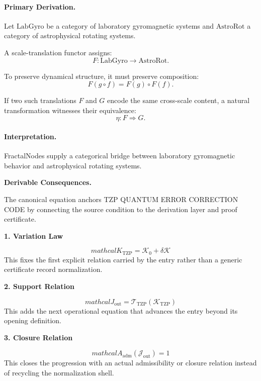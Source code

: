 \paragraph{Primary Derivation.}
Let $\mathrm{LabGyro}$ be a category of laboratory gyromagnetic systems and $\mathrm{AstroRot}$ a category of astrophysical rotating systems.

A scale-translation functor assigns:
\begin{equation}
F:\mathrm{LabGyro}\to\mathrm{AstroRot}.
\end{equation}

To preserve dynamical structure, it must preserve composition:
\begin{equation}
F(g\circ f)=F(g)\circ F(f).
\end{equation}

If two such translations $F$ and $G$ encode the same cross-scale content, a natural transformation witnesses their equivalence:
\begin{equation}
\boxed{
\eta:F\Rightarrow G .
}
\end{equation}

\paragraph{Interpretation.}
FractalNodes supply a categorical bridge between laboratory gyromagnetic behavior and astrophysical rotating systems.

\par\vspace{0.35em}
\noindent\textbf{Derivable Consequences.}\quad
\begingroup
\footnotesize
\raggedright
The canonical equation anchors TZP QUANTUM ERROR CORRECTION CODE by connecting the source condition to the derivation layer and proof certificate.
\par\endgroup

\noindent\textbf{1. Variation Law}\par
\[
mathcal{K}_{\mathrm{TZP}} = \mathcal{K}_0 + \delta \mathcal{K}
\]
\noindent This fixes the first explicit relation carried by the entry rather than a generic certificate record normalization.\par
\noindent\textbf{2. Support Relation}\par
\[
mathcal{J}_{\mathrm{out}} = \mathcal{T}_{\mathrm{TZP}}\!\left(\mathcal{K}_{\mathrm{TZP}}\right)
\]
\noindent This adds the next operational equation that advances the entry beyond its opening definition.\par
\noindent\textbf{3. Closure Relation}\par
\[
mathcal{A}_{\mathrm{adm}}\!\left(\mathcal{J}_{\mathrm{out}}\right)=1
\]
\noindent This closes the progression with an actual admissibility or closure relation instead of recycling the normalization shell.\par

